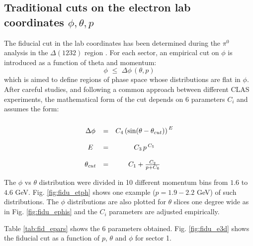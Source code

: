 \subsection{Traditional cuts on the electron lab coordinates $\phi, \theta, p$}
The fiducial cut in the lab coordinates has been determined during the $\pi^0$ analysis in
the $\Delta(1232)$ region \cite{bib:pi0_Delta}.
For each sector, an empirical cut on $\phi$ is introduced as a function of theta and momentum:
$$
\phi \,\,\le\,\, \Delta\phi \,(\theta, p)
$$
which is aimed to define regions of phase space whose distributions are flat in $\phi$.
After careful studies, and following a common approach between different CLAS experiments, the mathematical
form of the cut depends on 6 parameters  $C_i$
and assumes the form:\vspace{-0.3 cm}
$$
\begin{array}{c c c}
    \\
    \Delta\phi   & = & C_4 \left( \sin (\theta - \theta_{cut}) \right) ^{\,E} \\
    \\
    E        & = & C_3\, p\, ^{C_5} \\
    \\
    \theta_{cut} & = & C_1 + \frac{C_2}{p + C_6}
\end{array}
$$

The $\phi$ vs $\theta$ distribution were divided in 10 different momentum bins from $1.6$ to $4.6$ GeV.
Fig. \ref{fig:fidu_etph} shows one example ($p=1.9-2.2$ GeV) of such distributions.
The $\phi$ distributions are also plotted for $\theta$ slices one degree wide as in Fig. \ref{fig:fidu_ephis}
and the $C_i$ parameters are adjusted empirically.

Table \ref{tab:fid_epars} shows the 6 parameters obtained. Fig. \ref{fig:fidu_e3d} shows
the fiducial cut as a function of $p$, $\theta$ and $\phi$ for sector 1.

